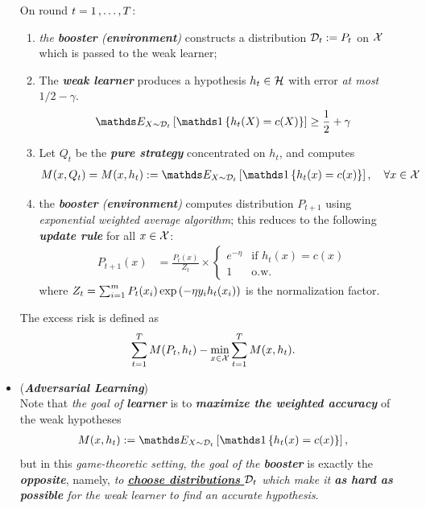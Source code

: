 \documentclass[11pt]{article}
\begin{document}
\begin{itemize}
\begin{remark}[Algorithm]
 On round $t = 1 \,{,}\ldots{,}\, T$:
\begin{enumerate}
\item  \emph{the \textbf{booster} (\textbf{environment})} constructs a distribution ${\mathcal D}_t := P_t$ on ${\mathcal X}$ which is passed to the weak learner;
\item The \emph{\textbf{weak learner}} produces a hypothesis $h_t \in {\mathcal H}$ with error \emph{at most}  $1/2 - \gamma$.
\begin{align*}
\E{X\sim\cD_t}{\ind{h_t(X) = c(X)}} \ge \frac{1}{2} + \gamma
\end{align*}
\item Let $Q_t$ be the \textbf{\emph{pure strategy}} concentrated on $h_t$, and computes
\begin{align*}
M(x, Q_t) = M(x, h_t)  := \E{X\sim\cD_t}{\ind{h_t(x) = c(x)}}, \quad \forall x \in \cX
\end{align*}
\item  the \emph{\textbf{booster} (\textbf{environment})} computes distribution $P_{t+1}$ using \emph{exponential weighted average algorithm}; this reduces to the following \emph{\textbf{update rule}} for all $x \in {\mathcal X}$:
\begin{align*}
P_{t+1}(x) &= \frac{P_t(x)}{Z_t} \times \left\{ \begin{array}{cc}
e^{-\eta} &\text{if } h_t(x) = c(x)\\
1 & \text{o.w.}
\end{array}
\right.
\end{align*} where $Z_t = \sum_{i=1}^{m}P_t(x_i)\exp\left( -\eta y_i h_t(x_i)\right)$ is the normalization factor.
\end{enumerate} 
The excess risk is defined as
\begin{align*}
\sum_{t=1}^{T} M(P_t, h_t) - \min_{x \in {\mathcal X}}\sum_{t=1}^{T}M(x, h_t).
\end{align*}
\end{remark}

\item \begin{remark}(\textbf{\emph{Adversarial Learning}})\\
Note that \emph{the goal of \textbf{learner}} is to \emph{\textbf{maximize the weighted accuracy}} of the weak hypotheses
\begin{align*}
M(x, h_t)  := \E{X\sim\cD_t}{\ind{h_t(x) = c(x)}},
\end{align*} but in this \emph{game-theoretic setting}, \emph{the goal of the \textbf{booster}} is exactly the \textbf{\emph{opposite}}, namely, \emph{to \underline{\textbf{choose distributions} ${\mathcal D}_t$} which make it \textbf{as hard as possible} for the weak learner to find an accurate hypothesis}. 
\end{remark}




\end{itemize}
\end{document}
